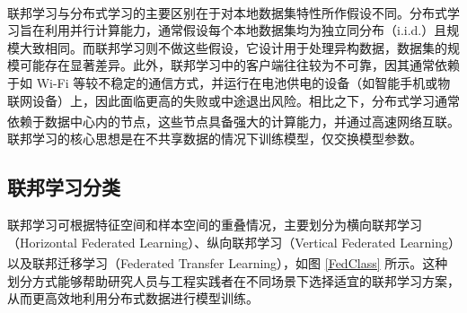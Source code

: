 联邦学习与分布式学习的主要区别在于对本地数据集特性所作假设不同\textsuperscript{\cite{konevcny2015federated}}。分布式学习旨在利用并行计算能力，通常假设每个本地数据集均为独立同分布（i.i.d.）且规模大致相同。而联邦学习则不做这些假设，它设计用于处理异构数据，数据集的规模可能存在显著差异。此外，联邦学习中的客户端往往较为不可靠，因其通常依赖于如 Wi-Fi 等较不稳定的通信方式，并运行在电池供电的设备（如智能手机或物联网设备）上，因此面临更高的失败或中途退出风险。相比之下，分布式学习通常依赖于数据中心内的节点，这些节点具备强大的计算能力，并通过高速网络互联\textsuperscript{\cite{kairouz2021advances}}。联邦学习的核心思想是在不共享数据的情况下训练模型，仅交换模型参数。

\subsection{联邦学习分类}
联邦学习可根据特征空间和样本空间的重叠情况，主要划分为横向联邦学习（Horizontal Federated Learning）、纵向联邦学习（Vertical Federated Learning）以及联邦迁移学习（Federated Transfer Learning）\textsuperscript{\cite{yang2019federated,li2020federated}}，如图 \ref{FedClass} 所示。这种划分方式能够帮助研究人员与工程实践者在不同场景下选择适宜的联邦学习方案，从而更高效地利用分布式数据进行模型训练。

